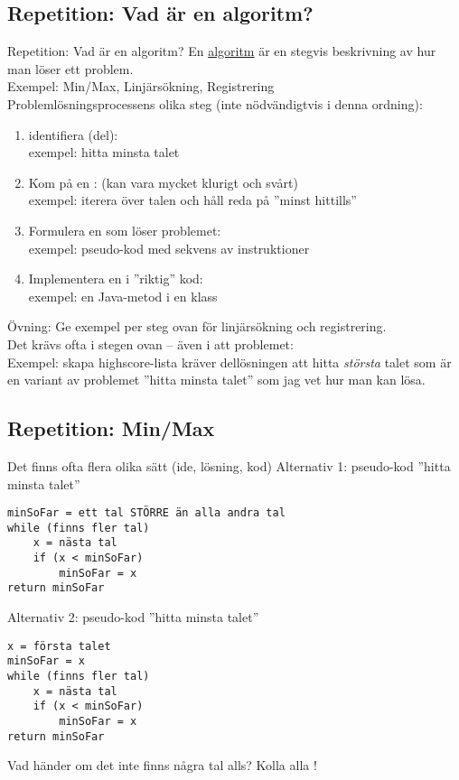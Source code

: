 \documentclass{lecturenotes}
\begin{document}
\subsection{Repetition: Vad är en algoritm?}
\begin{Slide}{Repetition: Vad är en algoritm? }\footnotesize
En \href{https://sv.wikipedia.org/wiki/Algoritm}{algoritm} är en stegvis beskrivning av hur man löser ett problem. \\ 
Exempel: Min/Max, Linjärsökning, Registrering \\
\vspace{1em}
Problemlösningsprocessens olika steg (inte nödvändigtvis i denna ordning): 
\begin{enumerate}
\item identifiera (del): \\ exempel: hitta minsta talet
\item Kom på en : (kan  vara mycket klurigt och svårt) \\ exempel: iterera över talen och håll reda på ''minst hittills''
\item Formulera en  som löser problemet: \\ exempel: pseudo-kod med sekvens av instruktioner
\item Implementera en  i ''riktig'' kod: \\ exempel: en Java-metod i en klass
\end{enumerate}
Övning: Ge exempel per steg ovan för linjärsökning och registrering. \\
Det krävs ofta  i stegen ovan  -- även i att  problemet: \\ Exempel: skapa highscore-lista kräver dellösningen att hitta \emph{största} talet som är en variant av problemet ''hitta minsta talet'' som jag vet hur man kan lösa.
\end{Slide}

\subsection{Repetition: Min/Max}
\begin{Slide}{Det finns ofta flera olika sätt (ide, lösning, kod)}\footnotesize
Alternativ 1: pseudo-kod ''hitta minsta talet''
\begin{lstlisting}
minSoFar = ett tal STÖRRE än alla andra tal
while (finns fler tal) 
    x = nästa tal
    if (x < minSoFar) 
        minSoFar = x
return minSoFar
\end{lstlisting}
Alternativ 2: pseudo-kod ''hitta minsta talet''
\begin{lstlisting}
x = första talet
minSoFar = x
while (finns fler tal) 
    x = nästa tal
    if (x < minSoFar) 
        minSoFar = x
return minSoFar
\end{lstlisting}
Vad händer om det inte finns några tal alls? Kolla alla !
\end{Slide}
\end{document}
